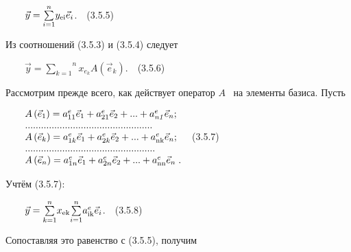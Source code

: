 \documentclass[a4paper]{article}
\newcommand\normalsubformula[1]{\text{\mathversion{normal}$#1$}}
\begin{document}
{\begin{russian}\sffamily
\ \ \ \  $\vec y=\overset n{\underset{i=1}{\sum }}y_{\normalsubformula{\text{ei}}}\vec e_i$.\ \ (3.5.5)
\end{russian}}

{\begin{russian}\sffamily
Из соотношений (3.5.3) и (3.5.4) следует
\end{russian}}

{\begin{russian}\sffamily
\ \ \ \  $\vec y=\overset n{\underset{k=1}{\sum }}x_{e_k}A\left(\vec e_k\right)$.\ \ (3.5.6)
\end{russian}}


\bigskip

{\begin{russian}\sffamily
Рассмотрим прежде всего, как действует оператор  $A$ \ на элементы базиса. Пусть
\end{russian}}

{\begin{russian}\sffamily
\ \ \ \  $\begin{matrix}A\left(\vec e_1\right)=a_{11}^e\vec e_1+a_{21}^e\vec e_2+...+a_{\mathit{n1}}^e\vec
e_n;\hfill\null \\................................................\hfill\null \\A\left(\vec e_k\right)=a_{1k}^e\vec
e_1+a_{2k}^e\vec e_2+...+a_{\normalsubformula{\text{nk}}}^e\vec e_n;\hfill\null
\\.................................................\hfill\null \\A\left(\vec e_n\right)=a_{1n}^e\vec e_1+a_{2n}^e\vec
e_2+...+a_{\normalsubformula{\text{nn}}}^e\vec e_n\;.\hfill\null \end{matrix}\hfill $\ \ (3.5.7)
\end{russian}}

{\begin{russian}\sffamily
Учтём (3.5.7):
\end{russian}}

{\begin{russian}\sffamily
\ \ \ \  $\vec y=\overset n{\underset{k=1}{\sum }}x_{\normalsubformula{\text{ek}}}\overset n{\underset{i=1}{\sum
}}a_{\normalsubformula{\text{ik}}}^e\vec e_i$.\ \ (3.5.8) 
\end{russian}}

{\begin{russian}\sffamily
Сопоставляя это равенство с (3.5.5), получим
\end{russian}}
\end{document}
